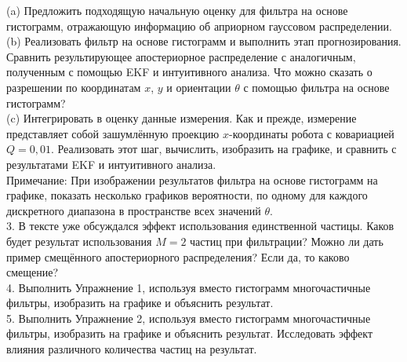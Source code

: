 \documentclass[10pt,a4paper]{article}
\begin{document}
(a) Предложить подходящую начальную оценку для фильтра на основе гистограмм, отражающую информацию об априорном гауссовом распределении.\\

(b) Реализовать фильтр на основе гистограмм и выполнить этап прогнозирования. Сравнить результирующее апостериорное распределение с аналогичным, полученным с помощью EKF и интуитивного анализа. Что можно сказать о разрешении по координатам $x$, $y$ и ориентации $\theta$ с помощью фильтра на основе гистограмм?\\

(c) Интегрировать в оценку данные измерения. Как и прежде, измерение представляет собой зашумлённую проекцию $x$-координаты робота с ковариацией $Q = 0,01$. Реализовать этот шаг, вычислить, изобразить на графике, и сравнить с результатами EKF и интуитивного анализа.\\
 
Примечание: При изображении результатов фильтра на основе гистограмм на графике,  показать несколько графиков вероятности, по одному для каждого дискретного диапазона в пространстве всех значений $\theta$.\\

3. В тексте уже обсуждался эффект использования единственной частицы. Каков будет результат использования $M = 2$ частиц при фильтрации? Можно ли дать пример смещённого апостериорного распределения? Если да, то каково смещение?\\

4. Выполнить Упражнение 1, используя вместо гистограмм многочастичные фильтры, изобразить на графике и объяснить результат.\\

5. Выполнить Упражнение 2, используя вместо гистограмм многочастичные фильтры, изобразить на графике и объяснить результат. Исследовать эффект влияния различного количества частиц на результат.\\
\end{document}
